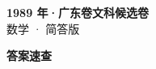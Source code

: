 \documentclass[zihao=-4, a4paper]{ctexart}
\begin{document}
\begin{center}
  {\Large\bfseries 1989 年·广东卷文科候选卷}\\[4pt]
  {\large 数学 · 简答版}
\end{center}
\medskip
{}

\clearpage
{}
\begin{center}{\Large\bfseries 答案速查}\end{center}
\medskip

\end{document}
